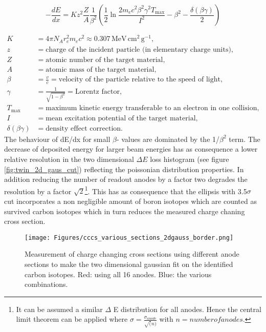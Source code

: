 \begin{equation}
-\frac{dE}{dx} = K z^2 \frac{Z}{A} \frac{1}{\beta^2} \left( \frac{1}{2} \ln \frac{2 m_e c^2 \beta^2 \gamma^2 T_{\text{max}}}{I^2} - \beta^2 - \frac{\delta(\beta \gamma)}{2} \right)
\end{equation}

\begin{align*}
K &= 4 \pi N_A r_e^2 m_e c^2 \approx 0.307 \, \text{MeV} \, \text{cm}^2 \, \text{g}^{-1}, \\
z &= \text{charge of the incident particle (in elementary charge units)}, \\
Z &= \text{atomic number of the target material}, \\
A &= \text{atomic mass of the target material}, \\
\beta &= \frac{v}{c} = \text{velocity of the particle relative to the speed of light}, \\
\gamma &= \frac{1}{\sqrt{1 - \beta^2}} = \text{Lorentz factor}, \\
T_{\text{max}} &= \text{maximum kinetic energy transferable to an electron in one collision}, \\
I &= \text{mean excitation potential of the target material}, \\
\delta(\beta \gamma) &= \text{density effect correction}.
\end{align*}
The behaviour of dE/dx for small $\beta$- values are dominated by the 1/$\beta^2$ term. The decrease of deposited energy for larger beam energies has as consequence a lower relative resolution in the two dimensional $\Delta E$ loss histogram (see figure \ref{fig:twin_2d_gaus_cut}) reflecting the poissonian distribution properties. In addition reducing the number of readout anodes by a factor two degrades the resolution by a factor $\sqrt{2}$\footnote{It can be assumed a similar $\Delta$ E distribution for all anodes. Hence the central limit theorem can be applied where $\sigma = \frac{\sigma_{anode}}{\sqrt(n)}$ with $n = number of anodes$.}. This has as consequence that the ellipsis with 3.5$\sigma$ cut incorporates a non negligible amount of boron isotopes which are counted as survived carbon isotopes which in turn reduces the measured charge chaning cross section.\newline
\begin{figure}[htpb]
    \centering
    \texttt{[image: Figures/cccs\_various\_sections\_2dgauss\_border.png]}
    \caption{
   	Measurement of charge changing cross sections using different anode sections to make the two dimensional gaussian fit on the identified carbon isotopes. Red: using all 16 anodes. Blue: the various combinations. 
     }
    \label{fig:cccs_gaus_diff_sections}
\end{figure}
